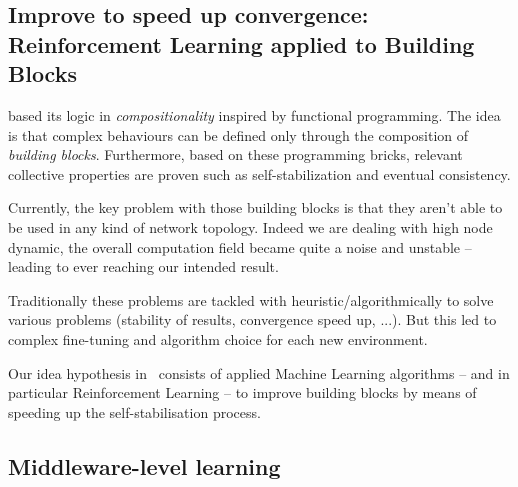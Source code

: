\documentclass[11pt]{article}
\begin{document}
\subsection{Improve to speed up convergence: Reinforcement Learning applied to Building Blocks}
\ac{} based its logic in \textit{compositionality} inspired by functional programming. The idea is that complex behaviours can be defined only through the composition of \emph{building blocks}. Furthermore, based on these programming bricks, relevant collective properties are proven such as self-stabilization and eventual consistency. 

Currently, the key problem with those building blocks is that they aren't able to be used in any kind of network topology. Indeed we are dealing with high node dynamic, the overall computation field became quite a noise and unstable -- leading to ever reaching our intended result.

Traditionally these problems are tackled with heuristic/algorithmically to solve various problems (stability of results, convergence speed up, ...). But this led to complex fine-tuning and algorithm choice for each new environment.

Our idea hypothesis in~\cite{research} consists of applied Machine Learning algorithms -- and in particular Reinforcement Learning -- to improve building blocks by means of speeding up the self-stabilisation process.
\subsection{Middleware-level learning}



\end{document}
